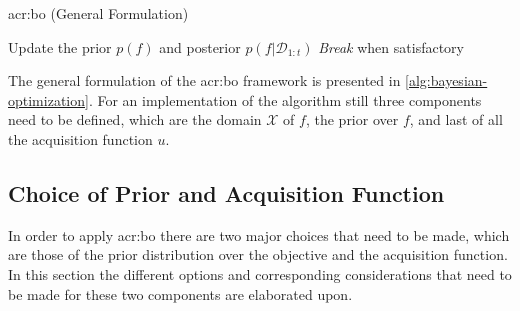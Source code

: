 \begin{algorithm}[!t]
	\caption{\acrlong{acr:bo} (General Formulation) \label{alg:bayesian-optimization}}
	\begin{algorithmic}[1]
		 
			 
			\State Update the prior $p(f)$ and posterior $p(f \vert \mathcal{D}_{1:t})$
			\State \textit{Break} when satisfactory 
		\EndFor
		\State {}
	\end{algorithmic}
\end{algorithm}

The general formulation of the \acrshort{acr:bo} framework is presented in \autoref{alg:bayesian-optimization}.
For an implementation of the algorithm still three components need to be defined, which are the domain $\mathcal{X}$ of $f$, the prior over $f$, and last of all the acquisition function $u$.

\subsection{Choice of Prior and Acquisition Function}
\label{sec:bayesian-optimization-prior-acquisition}
In order to apply \acrlong{acr:bo} there are two major choices that need to be made, which are those of the prior distribution over the objective and the acquisition function. In this section the different options and corresponding considerations that need to be made for these two components are elaborated upon.

